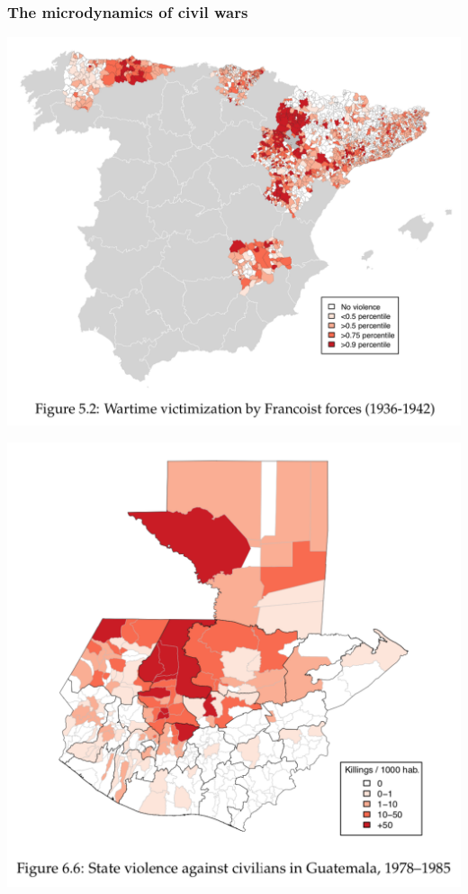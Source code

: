 \documentclass[aspectratio=43]{beamer}
\begin{document}
\begin{frame}
\frametitle{The microdynamics of civil wars}
\centering

\begin{minipage}{0.59\textwidth}\centering
  \includegraphics[width = \textwidth]{img/dissplot_spain}
\end{minipage}\hfill
\begin{minipage}{0.4\textwidth}\centering
  \includegraphics[width = \textwidth]{img/dissplot_guatemala}\\

\end{minipage}
\end{frame}
\end{document}
